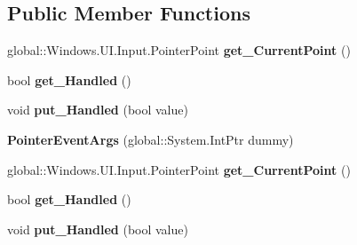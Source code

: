 \subsection*{Public Member Functions}
\begin{DoxyCompactItemize}
\item 
\mbox{\label{class_windows_1_1_u_i_1_1_core_1_1_pointer_event_args_a60253996efe6aa23360bb39f0288c55b}} 
global\+::\+Windows.\+U\+I.\+Input.\+Pointer\+Point {\bfseries get\+\_\+\+Current\+Point} ()
\item 
\mbox{\label{class_windows_1_1_u_i_1_1_core_1_1_pointer_event_args_ae5099383c4d10dec571b026258afc87e}} 
bool {\bfseries get\+\_\+\+Handled} ()
\item 
\mbox{\label{class_windows_1_1_u_i_1_1_core_1_1_pointer_event_args_ae122ac0156bd8ce343b58330f9715614}} 
void {\bfseries put\+\_\+\+Handled} (bool value)
\item 
\mbox{\label{class_windows_1_1_u_i_1_1_core_1_1_pointer_event_args_a47975f7ef4543d7e006ef3d76a69e42d}} 
{\bfseries Pointer\+Event\+Args} (global\+::\+System.\+Int\+Ptr dummy)
\item 
\mbox{\label{class_windows_1_1_u_i_1_1_core_1_1_pointer_event_args_a60253996efe6aa23360bb39f0288c55b}} 
global\+::\+Windows.\+U\+I.\+Input.\+Pointer\+Point {\bfseries get\+\_\+\+Current\+Point} ()
\item 
\mbox{\label{class_windows_1_1_u_i_1_1_core_1_1_pointer_event_args_ae5099383c4d10dec571b026258afc87e}} 
bool {\bfseries get\+\_\+\+Handled} ()
\item 
\mbox{\label{class_windows_1_1_u_i_1_1_core_1_1_pointer_event_args_ae122ac0156bd8ce343b58330f9715614}} 
void {\bfseries put\+\_\+\+Handled} (bool value)
\item 
\mbox{\label{class_windows_1_1_u_i_1_1_core_1_1_pointer_event_args_a47975f7ef4543d7e006ef3d76a69e42d}} 

\end{DoxyCompactItemize}
